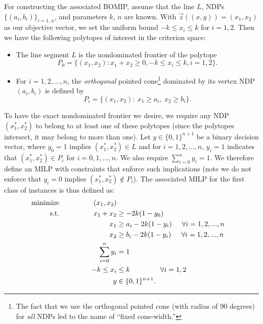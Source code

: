 \documentclass[11pt]{article} %
\begin{document}
For constructing the associated BOMIP, assume that the line $L$, NDPs $\{(a_i,b_i)\}_{i=1..n}$, and parameters $k$, $n$ are known. With $\vec{z}((x,y))=(x_1,x_2)$ as our objective vector, we set the uniform bound $-k\leq x_i \leq k$ for $i=1,2$. Then we have the following polytopes of interest in the criterion space: 
\begin{itemize}
\item The line segment $L$ is the nondominated frontier of the polytope 
$$P_0 = \{(x_1,x_2): x_1+x_2\geq 0, -k\leq x_i \leq k, i=1,2\}.$$
\item For $i=1,2,...,n$, the \textit{orthogonal} pointed cone\footnote{The fact that we use the orthogonal pointed cone (with radius of 90 degrees) for \textit{all} NDPs led to the name of ``fixed cone-width.''} dominated by its vertex NDP $(a_i,b_i)$ is defined by
$$P_i =\{(x_1,x_2):\ x_1 \geq a_i,\ x_2 \geq b_i \}.
$$
\end{itemize}
To have the exact nondominated frontier we desire, we require any NDP $(x^*_1,x^*_2)$ to belong to at least one of these polytopes (since the polytopes intersect, it may belong to more than one). Let $y\in\{0,1\}^{n+1}$ be a binary decision vector, where $y_0=1$ implies $(x^*_1,x^*_2)\in L$ and for $i=1,2,...,n$, $y_i=1$ indicates that $(x^*_1,x^*_2)\in P_i$ for $i=0,1,...,n$. We also require $\sum_{i=0}^n y_i =1$. We therefore define an MILP with constraints that enforce such implications (note we do not enforce that $y_i=0$ implies $(x^*_1,x^*_2)\not\in P_i$). The associated MILP for the first class of instances is thus defined as:
\begin{align}
\text{minimize}\hspace{1.7cm} (x_1,x_2) \nonumber \\
\text{s.t.}\hspace{1.7cm} x_1+x_2 &\geq -2k(1-y_0) \label{MILP:Lconstraint} \\
x_1 &\geq a_i -2k(1-y_i) \hspace{0.5cm} \forall i=1,2,...,n \label{MILP:Aconstraint} \\
x_2 &\geq b_i -2k(1-y_i) \hspace{0.5cm} \forall i=1,2,...,n \label{MILP:Bconstraint} \\
\sum_{i=0}^{n} y_i &=1 \\ 
-k \leq x_i &\leq k \hspace{1.5cm} \forall i=1,2 \label{MILP:bounds} \\
y&\in\{0,1\}^{n+1}. \nonumber 
\end{align}
\end{document}
